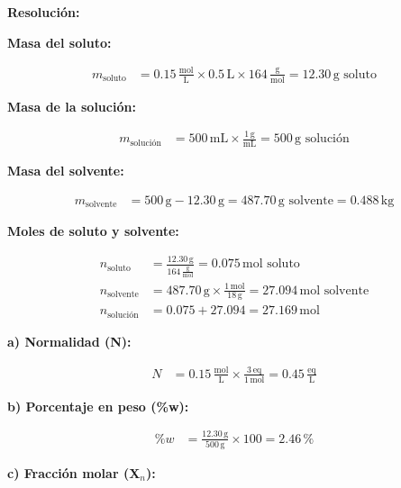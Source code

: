 \documentclass{article}
\begin{document}

\noindent\textbf{Resolución:} %

\textbf{Masa del soluto:}

\begin{align*}
    m_{\text{soluto}} &= 0.15 \, \frac{\text{mol}}{\text{L}} \times 0.5 \, \text{L} \times 164 \, \frac{\text{g}}{\text{mol}} = 12.30 \, \text{g soluto}
\end{align*}

\textbf{Masa de la solución:}

\begin{align*}
    m_{\text{solución}} &= 500 \, \text{mL} \times \frac{1 \, \text{g}}{\text{mL}} = 500 \, \text{g solución}
\end{align*}

\textbf{Masa del solvente:}

\begin{align*}
    m_{\text{solvente}} &= 500 \, \text{g} - 12.30 \, \text{g} = 487.70 \, \text{g solvente} = 0.488 \, \text{kg}
\end{align*}

\textbf{Moles de soluto y solvente:}

\begin{align*}
    n_{\text{soluto}} &= \frac{12.30 \, \text{g}}{164 \, \frac{\text{g}}{\text{mol}}} = 0.075 \, \text{mol soluto} \\[10pt]
    n_{\text{solvente}} &= 487.70 \, \text{g} \times \frac{1 \, \text{mol}}{18 \, \text{g}} = 27.094 \, \text{mol solvente} \\[10pt]
    n_{\text{solución}} &= 0.075 + 27.094 = 27.169 \, \text{mol}
\end{align*}

\textbf{a) Normalidad (N):}

\begin{align*}
    N &= 0.15 \, \frac{\text{mol}}{\text{L}} \times \frac{3 \, \text{eq}}{1 \, \text{mol}} = 0.45 \, \frac{\text{eq}}{\text{L}}
\end{align*}

\textbf{b) Porcentaje en peso (\%w):}

\begin{align*}
    \%w &= \frac{12.30 \, \text{g}}{500 \, \text{g}} \times 100 = 2.46 \, \%
\end{align*}

\textbf{c) Fracción molar (X$_n$):}
\end{document}

